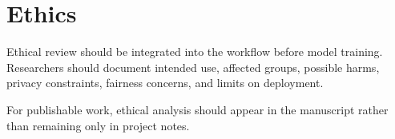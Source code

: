 \section{Ethics}

Ethical review should be integrated into the workflow before model training. Researchers should document intended use, affected groups, possible harms, privacy constraints, fairness concerns, and limits on deployment.

For publishable work, ethical analysis should appear in the manuscript rather than remaining only in project notes.
